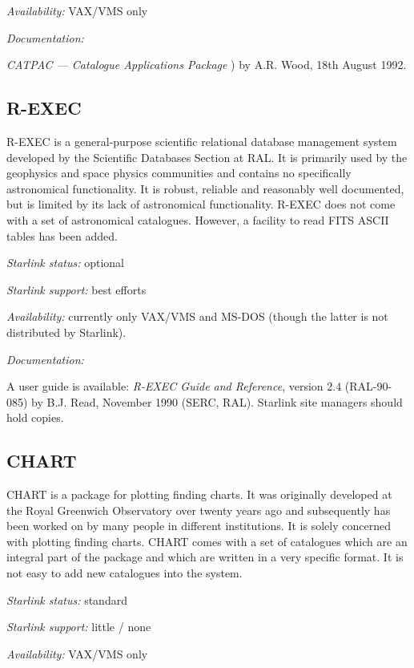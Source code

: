 \documentclass[twoside,11pt,nolof]{starlink}
\begin{document}
\textit{Availability:} VAX/VMS only

\textit{Documentation:}

\textit{CATPAC --- Catalogue Applications Package}
) by A.R. Wood,
18th August 1992.

\subsection{R-EXEC}

R-EXEC is a general-purpose scientific relational database management
system developed by the Scientific Databases Section at RAL. It is
primarily used by the geophysics and space physics communities and
contains no specifically astronomical functionality. It is robust,
reliable and reasonably well documented, but is limited by its lack of
astronomical functionality. R-EXEC does not come with a set of
astronomical catalogues. However, a facility to read FITS ASCII tables
has been added.

\textit{Starlink status:} optional

\textit{Starlink support:} best efforts

\textit{Availability: } currently only VAX/VMS and MS-DOS (though the
latter is not distributed by Starlink).

\textit{Documentation: }

A user guide is available: \textit{R-EXEC Guide and Reference}, version
2.4 (RAL-90-085) by B.J. Read, November 1990 (SERC, RAL). Starlink site
managers should hold copies.

\subsection{CHART}

CHART is a package for plotting finding charts. It was originally
developed at the Royal Greenwich Observatory over twenty years ago and
subsequently has been worked on by many people in different
institutions. It is solely concerned with plotting finding charts. CHART
comes with a set of catalogues which are an integral part of the package
and which are written in a very specific format. It is not easy to add
new catalogues into the system.

\textit{Starlink status:} standard

\textit{Starlink support:} little / none

\textit{Availability:} VAX/VMS only
\end{document}
